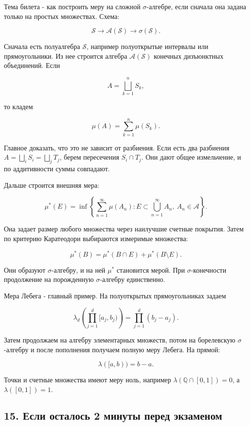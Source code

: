\documentclass[
  11pt,
  a4paper,
]{article}
\begin{document}
Тема билета - как построить меру на сложной \(\sigma\)-алгебре, если
сначала она задана только на простых множествах. Схема:

\[
\mathcal S\to\mathcal A(\mathcal S)\to\sigma(\mathcal S).
\]

Сначала есть полуалгебра \(\mathcal S\), например полуоткрытые интервалы
или прямоугольники. Из нее строится алгебра \(\mathcal A(\mathcal S)\)
конечных дизъюнктных объединений. Если

\[
A=\bigsqcup_{k=1}^nS_k,
\]

то кладем

\[
\mu(A)=\sum_{k=1}^n\mu(S_k).
\]

Главное доказать, что это не зависит от разбиения. Если есть два
разбиения \(A=\bigsqcup_iS_i=\bigsqcup_jT_j\), берем пересечения
\(S_i\cap T_j\). Они дают общее измельчение, и по аддитивности суммы
совпадают.

Дальше строится внешняя мера:

\[
\mu^*(E)=
\inf\left\{
\sum_{n=1}^{\infty}\mu(A_n):
E\subset\bigcup_{n=1}^{\infty}A_n,\ A_n\in\mathcal A
\right\}.
\]

Она задает размер любого множества через наилучшие счетные покрытия.
Затем по критерию Каратеодори выбираются измеримые множества:

\[
\mu^*(B)=\mu^*(B\cap E)+\mu^*(B\setminus E).
\]

Они образуют \(\sigma\)-алгебру, и на ней \(\mu^*\) становится мерой.
При \(\sigma\)-конечности продолжение на порожденную \(\sigma\)-алгебру
единственно.

Мера Лебега - главный пример. На полуоткрытых прямоугольниках задаем

\[
\lambda_d\left(\prod_{j=1}^d[a_j,b_j)\right)
=
\prod_{j=1}^d(b_j-a_j).
\]

Затем продолжаем на алгебру элементарных множеств, потом на борелевскую
\(\sigma\)-алгебру и после пополнения получаем полную меру Лебега. На
прямой:

\[
\lambda([a,b))=b-a.
\]

Точки и счетные множества имеют меру ноль, например
\(\lambda(\mathbb Q\cap[0,1])=0\), а \(\lambda([0,1])=1\).

\subsection{15. Если осталось 2 минуты перед
экзаменом}\label{ux435ux441ux43bux438-ux43eux441ux442ux430ux43bux43eux441ux44c-2-ux43cux438ux43dux443ux442ux44b-ux43fux435ux440ux435ux434-ux44dux43aux437ux430ux43cux435ux43dux43eux43c}
\end{document}
